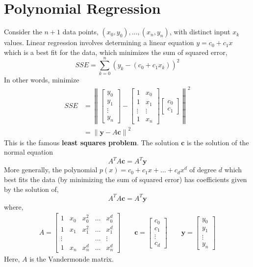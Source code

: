 \documentclass[letterpaper,12pt]{article}
\theoremstyle{definition}
\renewcommand{\vec}[1]{\mathbf{#1}}
\newcommand{\norm}[1]{\left\lVert #1 \right\rVert}
\begin{document}
\section*{Polynomial Regression}
Consider the $n+1$ data points, $(x_0,y_0), \dots, (x_n,y_n)$, with distinct input $x_k$ values. Linear regression involves determining a linear equation $y = c_0 + c_1 x$ which is a best fit for the data, which minimizes the sum of squared error,
\begin{equation*}
    SSE = \sum_{k=0}^n (y_k - (c_0 + c_1 x_k))^2
\end{equation*}
In other words, minimize
\begin{align*}
    SSE & = \norm{\begin{bmatrix} y_0 \\ y_1 \\ \vdots \\ y_n \end{bmatrix} - \begin{bmatrix} 1 & x_0 \\ 1 & x_1 \\ \vdots & \vdots \\ 1 & x_n \end{bmatrix} \begin{bmatrix} c_0 \\ c_1 \end{bmatrix}}^2 \\
    & = \norm{\vec{y} - A \vec{c}}^2
\end{align*}
This is the famous \textbf{least squares problem}. The solution $\vec{c}$ is the solution of the normal equation
\begin{equation*}
    A^T A \vec{c} = A^T \vec{y}
\end{equation*}
More generally, the polynomial $p(x) = c_0 + c_1 x + \dots + c_d x^d$ of degree $d$ which best fits the data (by minimizing the sum of squared error) has coefficients given by the solution of,
\begin{equation*}
    A^T A \vec{c} = A^T \vec{y}
\end{equation*}
where,
\begin{align*}
    A = \begin{bmatrix} 1 & x_0 & x_0^2 & \dots & x_0^d \\
    1 & x_1 & x_1^2 & \dots & x_1^d \\
    \vdots & & & \dots & \vdots \\
    1 & x_n & x_n^d & \dots & x_n^d \end{bmatrix} \qquad \vec{c} = \begin{bmatrix} c_0 \\ c_1 \\ \vdots \\ c_d \end{bmatrix} \qquad \vec{y} = \begin{bmatrix} y_0 \\ y_1 \\ \vdots \\ y_n \end{bmatrix}
\end{align*}
Here, $A$ is the Vandermonde matrix.
\end{document}
